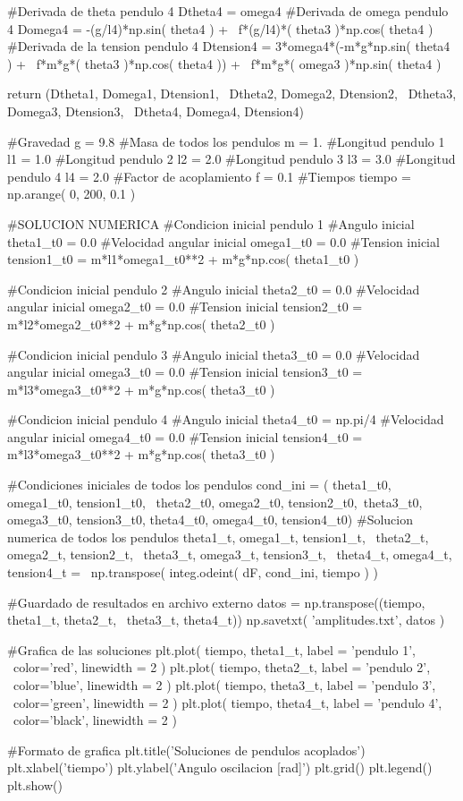 \begin{listing}[style=python]
    #Derivada de theta pendulo 4
    Dtheta4 = omega4
    #Derivada de omega pendulo 4
    Domega4 = -(g/l4)*np.sin( theta4 ) + \
    f*(g/l4)*( theta3 )*np.cos( theta4 )
    #Derivada de la tension pendulo 4
    Dtension4 = 3*omega4*(-m*g*np.sin( theta4 ) + \
    f*m*g*( theta3 )*np.cos( theta4 )) + \
    f*m*g*( omega3 )*np.sin( theta4 )
    
    return (Dtheta1, Domega1, Dtension1, \
    Dtheta2, Domega2, Dtension2, \
    Dtheta3, Domega3, Dtension3, \
    Dtheta4, Domega4, Dtension4)
    
#Gravedad
g = 9.8
#Masa de todos los pendulos
m = 1.
#Longitud pendulo 1
l1 = 1.0
#Longitud pendulo 2
l2 = 2.0
#Longitud pendulo 3
l3 = 3.0
#Longitud pendulo 4
l4 = 2.0
#Factor de acoplamiento 
f = 0.1
#Tiempos
tiempo = np.arange( 0, 200, 0.1 )
    

#SOLUCION NUMERICA
#Condicion inicial pendulo 1
#Angulo inicial
theta1_t0 = 0.0
#Velocidad angular inicial
omega1_t0 = 0.0
#Tension inicial
tension1_t0 = m*l1*omega1_t0**2 + m*g*np.cos( theta1_t0 )

#Condicion inicial pendulo 2
#Angulo inicial
theta2_t0 = 0.0
#Velocidad angular inicial
omega2_t0 = 0.0
#Tension inicial
tension2_t0 = m*l2*omega2_t0**2 + m*g*np.cos( theta2_t0 )

#Condicion inicial pendulo 3
#Angulo inicial
theta3_t0 = 0.0
#Velocidad angular inicial
omega3_t0 = 0.0
#Tension inicial
tension3_t0 = m*l3*omega3_t0**2 + m*g*np.cos( theta3_t0 )

#Condicion inicial pendulo 4
#Angulo inicial
theta4_t0 = np.pi/4
#Velocidad angular inicial
omega4_t0 = 0.0
#Tension inicial
tension4_t0 = m*l3*omega3_t0**2 + m*g*np.cos( theta3_t0 )

#Condiciones iniciales de todos los pendulos
cond_ini = ( theta1_t0, omega1_t0, tension1_t0, \
theta2_t0, omega2_t0, tension2_t0,\
theta3_t0, omega3_t0, tension3_t0,
theta4_t0, omega4_t0, tension4_t0)
#Solucion numerica de todos los pendulos
theta1_t, omega1_t, tension1_t, \
theta2_t, omega2_t, tension2_t, \
theta3_t, omega3_t, tension3_t, \
theta4_t, omega4_t, tension4_t = \
np.transpose( integ.odeint( dF, cond_ini, tiempo ) )

#Guardado de resultados en archivo externo
datos = np.transpose((tiempo, theta1_t, theta2_t, \
theta3_t, theta4_t))
np.savetxt( 'amplitudes.txt', datos )

#Grafica de las soluciones
plt.plot( tiempo, theta1_t, label = 'pendulo 1', \
color='red', linewidth = 2 )
plt.plot( tiempo, theta2_t, label = 'pendulo 2', \
color='blue', linewidth = 2 )
plt.plot( tiempo, theta3_t, label = 'pendulo 3', \
color='green', linewidth = 2 )
plt.plot( tiempo, theta4_t, label = 'pendulo 4', \
color='black', linewidth = 2 )

#Formato de grafica
plt.title('Soluciones de pendulos acoplados')
plt.xlabel('tiempo')
plt.ylabel('Angulo oscilacion [rad]')
plt.grid()
plt.legend()
plt.show()
\end{listing}


